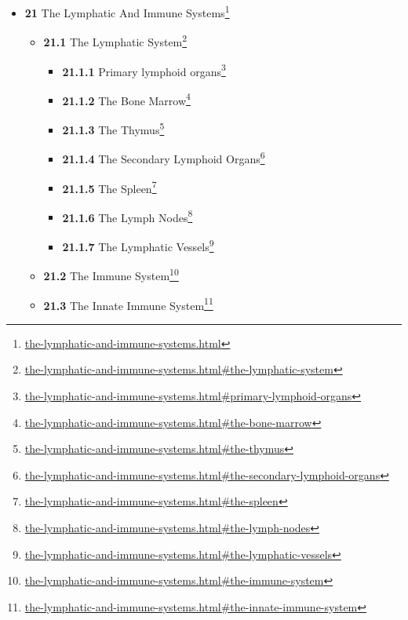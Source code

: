 \documentclass[
]{article}
\providecommand{\tightlist}{%
  \setlength{\itemsep}{0pt}\setlength{\parskip}{0pt}}
\providecommand{\tightlist}{%
  \setlength{\itemsep}{0pt}\setlength{\parskip}{0pt}}
\let\rmarkdownfootnote\footnote%
\def\footnote{\protect\rmarkdownfootnote}
\renewcommand{\href}[2]{#2\footnote{\url{#1}}}
\theoremstyle{definition}
\theoremstyle{definition}
\theoremstyle{definition}
\theoremstyle{remark}
\begin{document}
\begin{itemize}
\begin{itemize}
    \begin{itemize}
    \tightlist
    \item
      \href{circulatory-systems.html\#portal-veins}{\emph{}\textbf{20.9.1}
      Portal veins}
    \end{itemize}
  \item
    \href{circulatory-systems.html\#the-systemic-circulation}{\emph{}\textbf{20.10}
    The Systemic Circulation}
  \item
    \href{circulatory-systems.html\#the-pulmonary-circulation}{\emph{}\textbf{20.11}
    The Pulmonary Circulation}
  \item
    \href{circulatory-systems.html\#cardiovascular-disease}{\emph{}\textbf{20.12}
    Cardiovascular Disease}
  \item
    \href{circulatory-systems.html\#history}{\emph{}\textbf{20.13}
    History}
  \end{itemize}
\item
  \href{the-lymphatic-and-immune-systems.html}{\emph{}\textbf{21} The
  Lymphatic And Immune Systems}

  \begin{itemize}
  \tightlist
  \item
    \href{the-lymphatic-and-immune-systems.html\#the-lymphatic-system}{\emph{}\textbf{21.1}
    The Lymphatic System}

    \begin{itemize}
    \tightlist
    \item
      \href{the-lymphatic-and-immune-systems.html\#primary-lymphoid-organs}{\emph{}\textbf{21.1.1}
      Primary lymphoid organs}
    \item
      \href{the-lymphatic-and-immune-systems.html\#the-bone-marrow}{\emph{}\textbf{21.1.2}
      The Bone Marrow}
    \item
      \href{the-lymphatic-and-immune-systems.html\#the-thymus}{\emph{}\textbf{21.1.3}
      The Thymus}
    \item
      \href{the-lymphatic-and-immune-systems.html\#the-secondary-lymphoid-organs}{\emph{}\textbf{21.1.4}
      The Secondary Lymphoid Organs}
    \item
      \href{the-lymphatic-and-immune-systems.html\#the-spleen}{\emph{}\textbf{21.1.5}
      The Spleen}
    \item
      \href{the-lymphatic-and-immune-systems.html\#the-lymph-nodes}{\emph{}\textbf{21.1.6}
      The Lymph Nodes}
    \item
      \href{the-lymphatic-and-immune-systems.html\#the-lymphatic-vessels}{\emph{}\textbf{21.1.7}
      The Lymphatic Vessels}
    \end{itemize}
  \item
    \href{the-lymphatic-and-immune-systems.html\#the-immune-system}{\emph{}\textbf{21.2}
    The Immune System}
  \item
    \href{the-lymphatic-and-immune-systems.html\#the-innate-immune-system}{\emph{}\textbf{21.3}
    The Innate Immune System}


\end{itemize}
\end{itemize}
\end{document}
